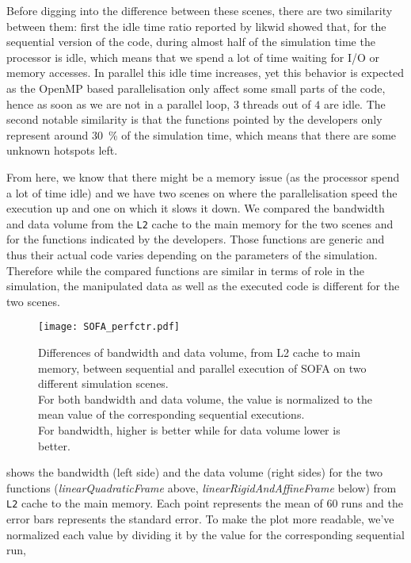 Before digging into the difference between these scenes, there are two
similarity between them: first the idle time ratio reported by likwid showed
that, for the sequential version of the code, during almost half of the
simulation time the processor is idle, which means that we spend a lot of time
waiting for \gls{I/O} or memory accesses. In parallel  this idle time
increases, yet this behavior is expected as the \gls{OpenMP} based
parallelisation only affect some small parts of the code, hence as soon as we
are not in a parallel loop, $3$ threads out of $4$ are idle. The second
notable similarity is that the functions pointed by the developers only represent
around \SI{30}{\%} of the simulation time, which means that there are some
unknown hotspots left.

From here, we know that there might be a memory issue (as the processor spend
a lot of time idle) and we have two scenes on where the parallelisation speed
the execution up and one on which it slows it down. We compared the bandwidth
and data volume from the \texttt{L2} cache to the main memory for the two
scenes and for the functions indicated by the developers. Those functions are
generic and thus their actual code varies depending on the parameters of the
simulation. Therefore while the compared functions are similar in terms of
role in the simulation, the manipulated data as well as the executed code is
different for the two scenes.

\begin{figure}[htb]
    \centering
    \texttt{[image: SOFA\_perfctr.pdf]}
    \caption[SOFA likwid results]{Differences of bandwidth and data volume, from L2 cache to main
        memory, between sequential and parallel execution of \gls{SOFA} on two
        different simulation scenes.
        \\
        For both bandwidth and data volume, the value is normalized to the
        mean value of the corresponding sequential executions.
        \\
        For bandwidth, higher is better while for data volume lower is better.
    }
    \label{fig:SOFA-perfctr}
\end{figure}

 shows the bandwidth (left side) and the data volume (right
sides) for the two functions (\emph{linearQuadraticFrame} above,
\emph{linearRigidAndAffineFrame} below) from \texttt{L2} cache to the main
memory. Each point represents the mean of $60$ runs and the error bars
represents the standard error. To make the plot more readable, we've
normalized each value by dividing it by the value for the corresponding
sequential run,

